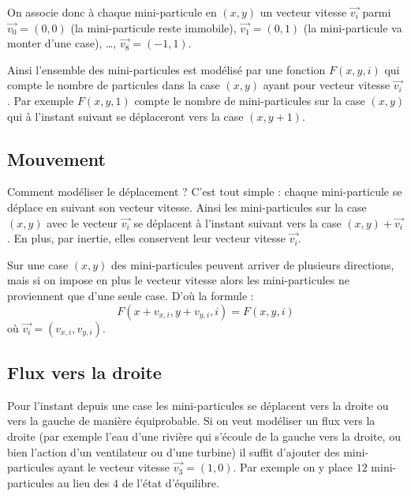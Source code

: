 \documentclass[11pt,class=report,crop=false]{standalone}
\begin{document}




On associe donc à chaque mini-particule en $(x,y)$ un vecteur vitesse $\vec{v_i}$ 
parmi $\vec{v_0} = (0,0)$ (la mini-particule reste immobile), $\vec{v_1} = (0,1)$ (la mini-particule va monter d'une case), \ldots, $\vec {v_8} = (-1,1)$.


Ainsi l'ensemble des mini-particules est modélisé par une fonction $F(x,y,i)$
qui compte le nombre de particules dans la case $(x,y)$ ayant pour vecteur vitesse  $\vec{v_i}$. Par exemple $F(x,y,1)$ compte le nombre de mini-particules sur la case $(x,y)$ qui à l'instant suivant se déplaceront vers la case $(x,y+1)$.



\subsection{Mouvement}

Comment modéliser le déplacement ? C'est tout simple : chaque mini-particule se déplace en suivant son vecteur vitesse. Ainsi les mini-particules sur la case $(x,y)$ avec le vecteur $\vec{v_i}$ se déplacent à l'instant suivant vers la case $(x,y) + \vec{v_i}$. En plus, par inertie, elles conservent leur vecteur vitesse $\vec{v_i}$.


Sur une case $(x,y)$ des mini-particules peuvent arriver de plusieurs directions, mais si on impose en plus le vecteur vitesse alors les mini-particules ne proviennent que d'une seule case. D'où la formule :
$$F(x + v_{x,i}, y + v_{y,i}, i) = F(x, y, i)$$
où $\vec {v_i} = (v_{x,i}, v_{y,i})$.


\subsection{Flux vers la droite}

Pour l'instant depuis une case les mini-particules se déplacent vers la droite ou vers la gauche de manière équiprobable. Si on veut modéliser un flux vers la droite (par exemple l'eau d'une rivière qui s'écoule de la gauche vers la droite, ou bien l'action d'un ventilateur ou d'une turbine) il suffit d'ajouter des mini-particules ayant le vecteur vitesse $\vec{v_3} = (1,0)$.
Par exemple on y place $12$ mini-particules au lieu des $4$ de l'état d'équilibre.
\end{document}
